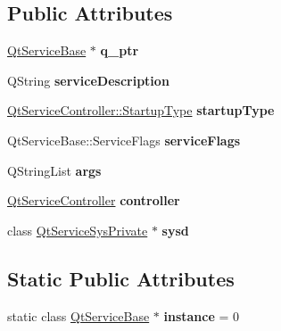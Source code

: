 \subsection*{Public Attributes}
\begin{DoxyCompactItemize}
\item 
\mbox{\label{class_qt_service_base_private_a3d7df7326eb36764f5311c58b086e973}} 
\mbox{\hyperlink{class_qt_service_base}{Qt\+Service\+Base}} $\ast$ {\bfseries q\+\_\+ptr}
\item 
\mbox{\label{class_qt_service_base_private_a3ad509ab3841b61bd30435d19b636712}} 
Q\+String {\bfseries service\+Description}
\item 
\mbox{\label{class_qt_service_base_private_a90e9a3f158cbeafd8fd336e03b46b364}} 
\mbox{\hyperlink{class_qt_service_controller_a946ac2b079d9760503da923c2eaf0aac}{Qt\+Service\+Controller\+::\+Startup\+Type}} {\bfseries startup\+Type}
\item 
\mbox{\label{class_qt_service_base_private_a2628f9a219995932e09d65708e0a1755}} 
Qt\+Service\+Base\+::\+Service\+Flags {\bfseries service\+Flags}
\item 
\mbox{\label{class_qt_service_base_private_a5f37fde173f2a524c191489b8ed8d7df}} 
Q\+String\+List {\bfseries args}
\item 
\mbox{\label{class_qt_service_base_private_abb527bd1c6933e4c947597c96198fe14}} 
\mbox{\hyperlink{class_qt_service_controller}{Qt\+Service\+Controller}} {\bfseries controller}
\item 
\mbox{\label{class_qt_service_base_private_a73030b7b6e1d0c3f6f8bbc96e0901751}} 
class \mbox{\hyperlink{class_qt_service_sys_private}{Qt\+Service\+Sys\+Private}} $\ast$ {\bfseries sysd}
\end{DoxyCompactItemize}
\subsection*{Static Public Attributes}
\begin{DoxyCompactItemize}
\item 
\mbox{\label{class_qt_service_base_private_ac33fafdd376bceb3365de00620da4f9d}} 
static class \mbox{\hyperlink{class_qt_service_base}{Qt\+Service\+Base}} $\ast$ {\bfseries instance} = 0
\end{DoxyCompactItemize}


